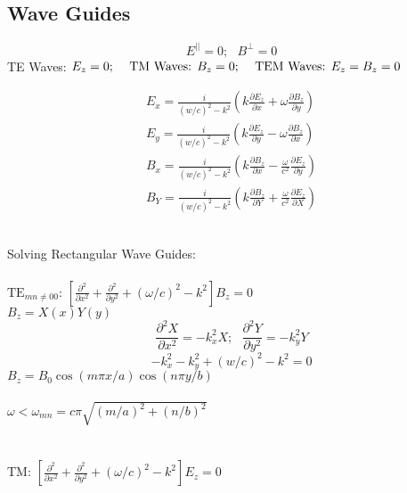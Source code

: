 \documentclass[12pt]{article}
\begin{document}
\subsection{Wave Guides}
\[E^{||} = 0; \ \ \ B^{\perp} = 0\]
TE Waves: \( E_z = 0;\ \ \ $ TM Waves: $B_z = 0;\ \ \ $ TEM Waves: $E_z = B_z = 0 \)

\begin{align*}
E_x = \frac{i}{ (w/c)^2 - k^2 } \left( k\frac{\partial E_z}{\partial x} + \omega\frac{\partial B_z}{\partial y} \right) \\
E_y = \frac{i}{ (w/c)^2 - k^2 } \left( k\frac{\partial E_z}{\partial y} - \omega\frac{\partial B_z}{\partial x} \right) \\
B_x = \frac{i}{ (w/c)^2 - k^2 } \left( k\frac{\partial B_z}{\partial x} - \frac{\omega}{c^2} \frac{\partial E_z}{\partial y} \right) \\
B_Y = \frac{i}{ (w/c)^2 - k^2 } \left( k\frac{\partial B_z}{\partial Y} + \frac{\omega}{c^2} \frac{\partial E_z}{\partial X} \right)
\end{align*}

\hfill \break \\
Solving Rectangular Wave Guides: \\ \\
\( \text{TE}_{mn \neq 00} \): 
\( \displaystyle \left[ \frac{\partial^2}{\partial x^2} 
	+ \frac{\partial^2}{\partial y^2} + (\omega / c)^2 -k^2 \right] B_z = 0 \) \\

$B_z = X(x)Y(y)$\\
\[ \frac{\partial^2 X}{\partial x^2} = -k_x^2 X;\ \ \ \frac{\partial^2 Y}{\partial y^2} = -k_y^2 Y\]
\[ -k_x^2 - k_y^2 + (w/c)^2 -k^2 = 0\] 
$B_z = B_0\cos(m\pi x/a)\cos(n\pi y/b)$ \\ \\
$\omega < \omega_{mn} = c\pi \sqrt{ (m/a)^2 + (n/b)^2 }$ \\ \\ \\
TM: \( \displaystyle \left[ \frac{\partial^2}{\partial x^2} 
	+ \frac{\partial^2}{\partial y^2} + (\omega / c)^2 -k^2 \right] E_z = 0 \)
\end{document}
